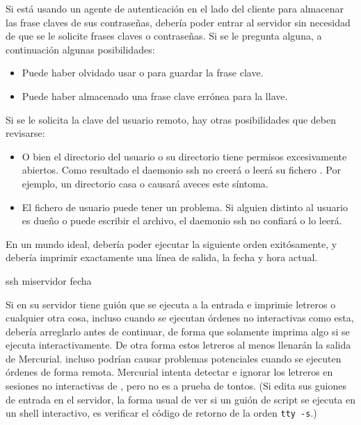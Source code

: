 Si está usando un agente de autenticación en el lado del cliente para
almacenar las frase claves de sus contraseñas, debería poder entrar al
servidor sin necesidad de que se le solicite frases claves o
contraseñas.  Si se le pregunta alguna, a continuación algunas
posibilidades:
\begin{itemize}
\item Puede haber olvidado usar  o
   para guardar la frase clave.
\item Puede haber almacenado una frase clave errónea para la llave.
\end{itemize}
Si se le solicita la clave del usuario remoto, hay otras posibilidades
que deben revisarse:
\begin{itemize}
\item O bien el directorio del usuario o su directorio 
  tiene permisos excesivamente abiertos.  Como resultado el daemonio
  ssh no creerá o leerá su fichero .  
  Por ejemplo, un directorio casa o  causará aveces
  este síntoma.
\item El fichero de usuario  puede tener
  un problema.  Si alguien distinto al usuario es dueño o puede
  escribir el archivo, el daemonio ssh no confiará o lo leerá.
\end{itemize}

En un mundo ideal, debería poder ejecutar la siguiente orden
exitósamente, y debería imprimir exactamente una línea de salida,
la fecha y hora actual.
\begin{codesample2}
  ssh miservidor fecha
\end{codesample2}

Si en su servidor tiene guión que se ejecuta a la entrada e imprimie
letreros o cualquier otra cosa, incluso cuando se ejecutan órdenes no
interactivas como esta, debería arreglarlo antes de continuar, de
forma que solamente imprima algo si se ejecuta interactivamente.  De
otra forma estos letreros al menos llenarán la salida de Mercurial.
incluso podrían causar problemas potenciales cuando se ejecuten
órdenes de forma remota.  Mercurial intenta detectar e ignorar los
letreros en sesiones no interactivas de , pero no es
a prueba de tontos.  (Si edita sus guiones de entrada en el servidor,
la forma usual de ver si un guión de script se ejecuta en un shell
interactivo, es verificar el código de retorno de la orden
\Verb|tty -s|.)

